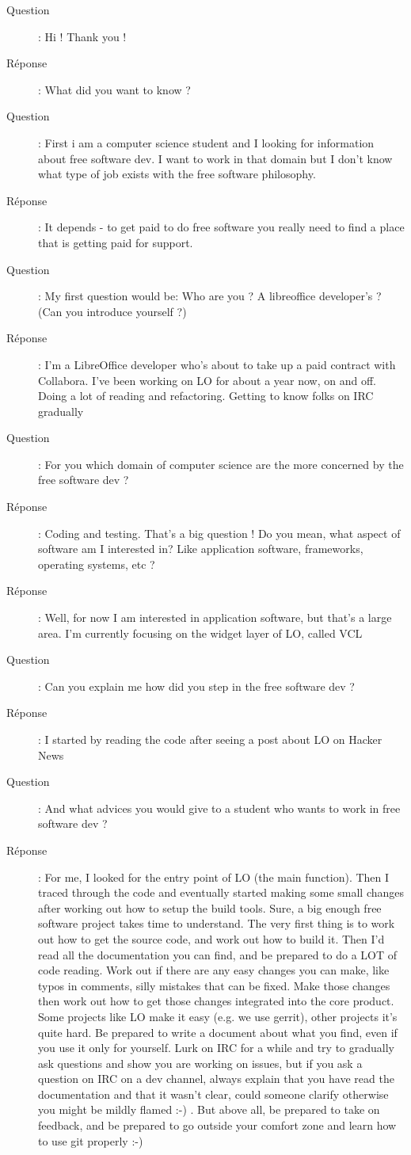 \documentclass[a4paper,12pt, draft]{report}
\begin{document}
\begin{description}
\item [Question]:  Hi ! Thank you !
\item [Réponse]:  What did you want to know ?
\item [Question]:  First i am a computer science student and I looking for information about free software dev. I want to work in that domain but I don't know what type of job exists with the free software philosophy.
\item [Réponse]:  It depends - to get paid to do free software you really need to find a place that is getting paid for support.
\item [Question]:  My first question would be: Who are you ? A libreoffice developer's ? (Can you introduce yourself ?)
\item [Réponse]:  I'm a LibreOffice developer who's about to take up a paid contract with Collabora. I've been working on LO for about a year now, on and off. Doing a lot of reading and refactoring. Getting to know folks on IRC gradually
\item [Question]:  For you which domain of computer science are the more concerned by the free software dev ?
\item [Réponse]:  Coding and testing. That's a big question ! Do you mean, what aspect of software am I interested in? Like application software, frameworks, operating systems, etc ?
\item [Réponse]:  Well, for now I am interested in application software, but that's a large area. I'm currently focusing on the widget layer of LO, called VCL
\item [Question]:  Can you explain me how did you step in the free software dev ?
\item [Réponse]:  I started by reading the code after seeing a post about LO on Hacker News
\item [Question]:  And what advices you would give to a student who wants to work in free software dev ?
\item [Réponse]:  For me, I looked for the entry point of LO (the main function). Then I traced through the code and eventually started making some small changes after working out how to setup the build tools. Sure, a big enough free software project takes time to understand. The very first thing is to work out how to get the source code, and work out how to build it. Then I'd read all the documentation you can find, and be prepared to do a LOT of code reading. Work out if there are any easy changes you can make, like typos in comments, silly mistakes that can be fixed. Make those changes then work out how to get those changes integrated into the core product. Some projects like LO make it easy (e.g. we use gerrit), other projects it's quite hard. Be prepared to write a document about what you find, even if you use it only for yourself. Lurk on IRC for a while and try to gradually ask questions and show you are working on issues, but if you ask a question on IRC on a dev channel, always explain that you have read the documentation and that it wasn't clear, could someone clarify otherwise you might be mildly flamed :-) . But above all, be prepared to take on feedback, and be prepared to go outside your comfort zone and learn how to use git properly :-)

\end{description}
\end{document}
